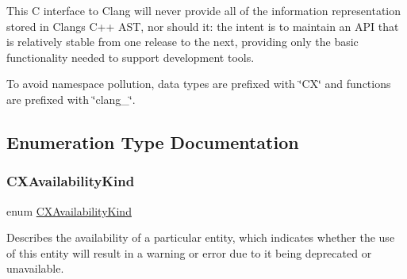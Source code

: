 This C interface to Clang will never provide all of the information representation stored in Clang\textquotesingle{}s C++ A\+ST, nor should it\+: the intent is to maintain an A\+PI that is relatively stable from one release to the next, providing only the basic functionality needed to support development tools.

To avoid namespace pollution, data types are prefixed with \char`\"{}\+C\+X\char`\"{} and functions are prefixed with \char`\"{}clang\+\_\+\char`\"{}. 

\subsection{Enumeration Type Documentation}
\mbox{\label{group__CINDEX_gada331ea0195e952c8f181ecf15e83d71}} 
\subsubsection{\texorpdfstring{C\+X\+Availability\+Kind}{CXAvailabilityKind}}
{\footnotesize\ttfamily enum \mbox{\hyperlink{group__CINDEX_gada331ea0195e952c8f181ecf15e83d71}{C\+X\+Availability\+Kind}}}



Describes the availability of a particular entity, which indicates whether the use of this entity will result in a warning or error due to it being deprecated or unavailable. 

